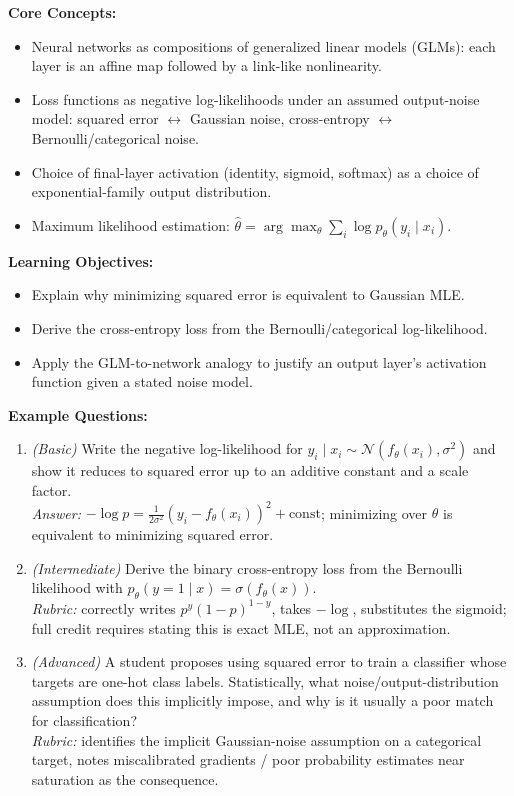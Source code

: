 \documentclass[11pt]{article}
\begin{document}
\textbf{Core Concepts:}
\begin{itemize}
  \item Neural networks as compositions of generalized linear models (GLMs): each layer is an affine map followed by a link-like nonlinearity.
  \item Loss functions as negative log-likelihoods under an assumed output-noise model: squared error $\leftrightarrow$ Gaussian noise, cross-entropy $\leftrightarrow$ Bernoulli/categorical noise.
  \item Choice of final-layer activation (identity, sigmoid, softmax) as a choice of exponential-family output distribution.
  \item Maximum likelihood estimation: $\hat\theta = \arg\max_\theta \sum_i \log p_\theta(y_i \mid x_i)$.
\end{itemize}

\textbf{Learning Objectives:}
\begin{itemize}
  \item Explain why minimizing squared error is equivalent to Gaussian MLE.
  \item Derive the cross-entropy loss from the Bernoulli/categorical log-likelihood.
  \item Apply the GLM-to-network analogy to justify an output layer's activation function given a stated noise model.
\end{itemize}

\textbf{Example Questions:}
\begin{enumerate}
  \item \textit{(Basic)} Write the negative log-likelihood for $y_i \mid x_i \sim \mathcal{N}(f_\theta(x_i), \sigma^2)$ and show it reduces to squared error up to an additive constant and a scale factor. \\
  \textit{Answer:} $-\log p = \tfrac{1}{2\sigma^2}(y_i - f_\theta(x_i))^2 + \text{const}$; minimizing over $\theta$ is equivalent to minimizing squared error.
  \item \textit{(Intermediate)} Derive the binary cross-entropy loss from the Bernoulli likelihood with $p_\theta(y=1\mid x) = \sigma(f_\theta(x))$. \\
  \textit{Rubric:} correctly writes $p^y(1-p)^{1-y}$, takes $-\log$, substitutes the sigmoid; full credit requires stating this is exact MLE, not an approximation.
  \item \textit{(Advanced)} A student proposes using squared error to train a classifier whose targets are one-hot class labels. Statistically, what noise/output-distribution assumption does this implicitly impose, and why is it usually a poor match for classification? \\
  \textit{Rubric:} identifies the implicit Gaussian-noise assumption on a categorical target, notes miscalibrated gradients / poor probability estimates near saturation as the consequence.
\end{enumerate}
\end{document}
